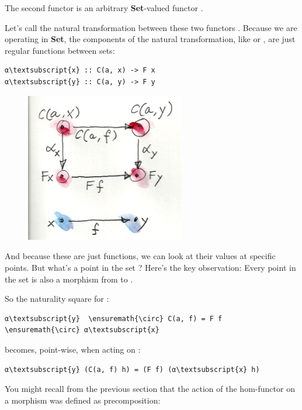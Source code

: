The second functor is an arbitrary \textbf{Set}-valued functor
.

Let's call the natural transformation between these two functors
. Because we are operating in \textbf{Set}, the components of
the natural transformation, like  or , are just
regular functions between sets:

\begin{Verbatim}[commandchars=\\\{\}]
α\textsubscript{x} :: C(a, x) -> F x
α\textsubscript{y} :: C(a, y) -> F y
\end{Verbatim}

\begin{figure}[H]
\centering
\includegraphics[width=2.73958in]{images/yoneda1.png}
\end{figure}

\noindent
And because these are just functions, we can look at their values at
specific points. But what's a point in the set ? Here's
the key observation: Every point in the set  is also a
morphism  from  to .

So the naturality square for :

\begin{Verbatim}[commandchars=\\\{\}]
α\textsubscript{y}  \ensuremath{\circ} C(a, f) = F f  \ensuremath{\circ} α\textsubscript{x}
\end{Verbatim}
becomes, point-wise, when acting on :

\begin{Verbatim}[commandchars=\\\{\}]
α\textsubscript{y} (C(a, f) h) = (F f) (α\textsubscript{x} h)
\end{Verbatim}
You might recall from the previous section that the action of the
hom-functor  on a morphism  was defined as
precomposition:

